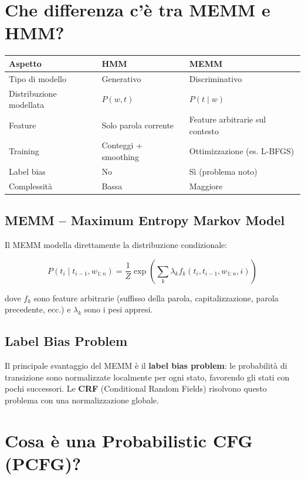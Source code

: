 \documentclass[12pt,a4paper]{article}
\begin{document}
\section{Che differenza c'è tra MEMM e HMM?}

\begin{center}
\begin{tabular}{lll}
\toprule
\textbf{Aspetto} & \textbf{HMM} & \textbf{MEMM} \\
\midrule
Tipo di modello & Generativo & Discriminativo \\
Distribuzione modellata & $P(w, t)$ & $P(t \mid w)$ \\
Feature & Solo parola corrente & Feature arbitrarie sul contesto \\
Training & Conteggi + smoothing & Ottimizzazione (es. L-BFGS) \\
Label bias & No & Sì (problema noto) \\
Complessità & Bassa & Maggiore \\
\bottomrule
\end{tabular}
\end{center}

\subsection{MEMM -- Maximum Entropy Markov Model}
Il MEMM modella direttamente la distribuzione condizionale:
\begin{formulabox}
\[
P(t_i \mid t_{i-1}, w_{1:n}) = \frac{1}{Z} \exp\!\left(\sum_k \lambda_k f_k(t_i, t_{i-1}, w_{1:n}, i)\right)
\]
\end{formulabox}
dove $f_k$ sono feature arbitrarie (suffisso della parola, capitalizzazione, parola precedente, ecc.) e $\lambda_k$ sono i pesi appresi.

\subsection{Label Bias Problem}
Il principale svantaggio del MEMM è il \textbf{label bias problem}: le probabilità di transizione sono normalizzate localmente per ogni stato, favorendo gli stati con pochi successori. Le \textbf{CRF} (Conditional Random Fields) risolvono questo problema con una normalizzazione globale.

\section{Cosa è una Probabilistic CFG (PCFG)?}
\end{document}
